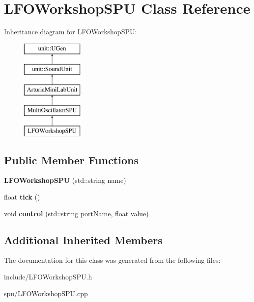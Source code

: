 \hypertarget{classLFOWorkshopSPU}{}\section{L\+F\+O\+Workshop\+S\+PU Class Reference}
\label{classLFOWorkshopSPU}
Inheritance diagram for L\+F\+O\+Workshop\+S\+PU\+:\begin{figure}[H]
\begin{center}
\leavevmode
\includegraphics[height=5.000000cm]{classLFOWorkshopSPU}
\end{center}
\end{figure}
\subsection*{Public Member Functions}
\begin{DoxyCompactItemize}
\item 
{\bfseries L\+F\+O\+Workshop\+S\+PU} (std\+::string name)\hypertarget{classLFOWorkshopSPU_af0da7426287c75e69999066976565005}{}\label{classLFOWorkshopSPU_af0da7426287c75e69999066976565005}

\item 
float {\bfseries tick} ()\hypertarget{classLFOWorkshopSPU_a0af8aaed492cecf1b6d3bf416393a8d1}{}\label{classLFOWorkshopSPU_a0af8aaed492cecf1b6d3bf416393a8d1}

\item 
void {\bfseries control} (std\+::string port\+Name, float value)\hypertarget{classLFOWorkshopSPU_a3c139a87ec2ec0c9cfa149f7652b11f8}{}\label{classLFOWorkshopSPU_a3c139a87ec2ec0c9cfa149f7652b11f8}

\end{DoxyCompactItemize}
\subsection*{Additional Inherited Members}


The documentation for this class was generated from the following files\+:\begin{DoxyCompactItemize}
\item 
include/L\+F\+O\+Workshop\+S\+P\+U.\+h\item 
spu/L\+F\+O\+Workshop\+S\+P\+U.\+cpp\end{DoxyCompactItemize}
